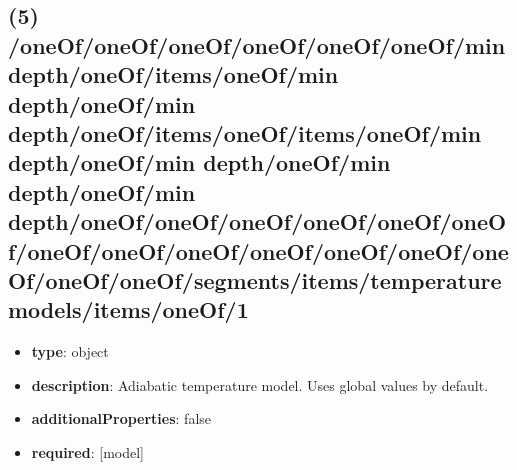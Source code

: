 \subsection{(5) /oneOf/oneOf/oneOf/oneOf/oneOf/oneOf/min depth/oneOf/items/oneOf/min depth/oneOf/min depth/oneOf/items/oneOf/items/oneOf/min depth/oneOf/min depth/oneOf/min depth/oneOf/min depth/oneOf/oneOf/oneOf/oneOf/oneOf/oneOf/oneOf/oneOf/oneOf/oneOf/oneOf/oneOf/oneOf/oneOf/oneOf/segments/items/temperature models/items/oneOf/1}
\begin{itemize}[leftmargin=5em]\item {\bf type}: object
\item {\bf description}: Adiabatic temperature model. Uses global values by default.
\item {\bf additionalProperties}: false
\item {\bf required}: [model]\end{itemize}
